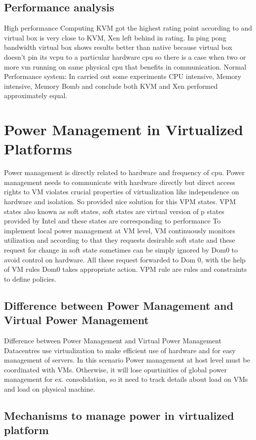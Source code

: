 \documentclass[seminar,twoside]{iitbreport}
\begin{document}
\subsection{Performance analysis}
High performance Computing KVM got the highest rating point according to \cite{comparisonm} and virtual 
box is very close to KVM, Xen left behind in rating. In ping pong bandwidth virtual
box shows results better than native because virtual box doesn’t pin its vcpu to a particular
hardware cpu so there is a case when two or more vm running on same physical cpu that
benefits in communication. Normal Performance system: In \cite{xenkvm2014} carried out some 
experiments CPU intensive, Memory intensive, Memory Bomb and conclude both KVM and Xen
performed approximately equal.
\section{Power Management in Virtualized Platforms}
Power management is directly related to hardware and frequency of cpu. Power management needs to communicate with hardware
directly but direct access rights to VM violates crucial properties of virtualization like
independence on hardware and isolation. So \cite{ripalm} provided nice solution for this VPM
states. VPM states also known as soft states, soft states are virtual version of p states provided by Intel and these
states are corresponding to performance To implement local power management at VM
level, VM continuously monitors utilization and according to that they requests desirable
soft state and these request for change in soft state sometimes can be simply ignored by
Dom0 to avoid control on hardware. All these request forwarded to Dom 0, with the help
of VM rules Dom0 takes appropriate action. VPM rule are rules and constraints to define
policies.
\subsection{Difference between Power Management and Virtual Power Management}
Difference between Power Management and Virtual Power Management
Datacentres use virtualization to make efficient use of hardware and for easy management 
of servers. In this scenario Power management at host level must be coordinated with VMs. 
Otherwise, it will lose opurtinities of global power management for ex. consolidation, 
so it need to track details about load on VMs and load on physical machine.
\subsection{Mechanisms to manage power in virtualized platform}
\end{document}
